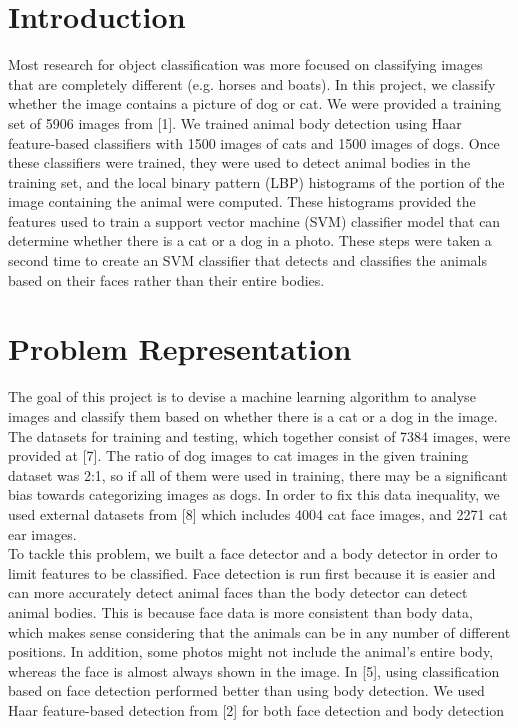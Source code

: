 \documentclass[conference,compsoc]{IEEEtran}
\begin{document}
\IEEEpeerreviewmaketitle

\section{Introduction}
Most research for object classification was more focused on classifying images that are completely different (e.g. horses and boats). In this project, we classify whether the image contains a picture of dog or cat. We were provided a training set of 5906 images from [1]. We trained animal body detection using Haar feature-based classifiers with 1500 images of cats and 1500 images of dogs. Once these classifiers were trained, they were used to detect animal bodies in the training set, and the local binary pattern (LBP) histograms of the portion of the image containing the animal were computed. These histograms provided the features used to train a support vector machine (SVM) classifier model that can determine whether there is a cat or a dog in a photo. These steps were taken a second time to create an SVM classifier that detects and classifies the animals based on their faces rather than their entire bodies.

\section{Problem Representation}
The goal of this project is to devise a machine learning algorithm to analyse images and classify them based on whether there is a cat or a dog in the image. The datasets for training and testing, which together consist of 7384 images, were provided at [7]. The ratio of dog images to cat images in the given training dataset was 2:1, so if all of them were used in training, there may be a significant bias towards categorizing images as dogs. In order to fix this data inequality, we used external datasets from [8] which includes 4004 cat face images, and 2271 cat ear images. \\

To tackle this problem, we built a face detector and a body detector in order to limit features to be classified. Face detection is run first because it is easier and can more accurately detect animal faces than the body detector can detect animal bodies. This is because face data is more consistent than body data, which makes sense considering that the animals can be in any number of different positions. In addition, some photos might not include the animal's entire body, whereas the face is almost always shown in the image. In [5], using classification based on face detection performed better than using body detection. We used Haar feature-based detection from [2] for both face detection and body detection\\
\end{document}
